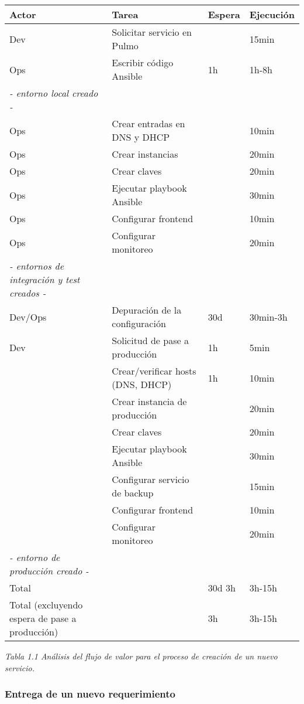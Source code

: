\begin{tabular}{|l|l|l|l|}
\hline
Actor & Tarea & Espera & Ejecución \\ \hline
Dev & Solicitar servicio en Pulmo &  & 15min \\ \hline
Ops & Escribir código Ansible & 1h & 1h-8h \\ \hline
\textit{- entorno local creado -} &  &  &  \\ \hline
Ops & Crear entradas en DNS y DHCP &  & 10min \\ \hline
Ops & Crear instancias &  & 20min \\ \hline
Ops & Crear claves &  & 20min \\ \hline
Ops & Ejecutar playbook Ansible &  & 30min \\ \hline
Ops & Configurar frontend &  & 10min \\ \hline
Ops & Configurar monitoreo &  & 20min \\ \hline
\textit{- entornos de integración y test creados -} &  &  &  \\ \hline
Dev/Ops & Depuración de la configuración & 30d & 30min-3h \\ \hline
Dev & Solicitud de pase a producción & 1h & 5min \\ \hline
 & Crear/verificar hosts (DNS, DHCP) & 1h & 10min \\ \hline
 & Crear instancia de producción &  & 20min \\ \hline
 & Crear claves &  & 20min \\ \hline
 & Ejecutar playbook Ansible &  & 30min \\ \hline
 & Configurar servicio de backup &  & 15min \\ \hline
 & Configurar frontend &  & 10min \\ \hline
 & Configurar monitoreo &  & 20min \\ \hline
\textit{- entorno de producción creado -} &  &  &  \\ \hline
Total &  & 30d 3h & 3h-15h \\ \hline
Total (excluyendo espera de pase a producción) &  & 3h & 3h-15h \\ \hline
\end{tabular}
\textit{Tabla 1.1 Análisis del flujo de valor para el proceso de creación de un nuevo servicio.}

\subsubsection{Entrega de un nuevo requerimiento}

